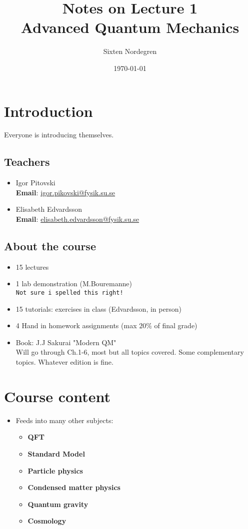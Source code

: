 \documentclass{elsarticle}
\title{Notes on Lecture 1 \\ Advanced Quantum Mechanics}
\author{Sixten Nordegren}
\date{\today}
\begin{document}
\maketitle
	\section*{Introduction}
	Everyone is introducing themselves.
	\subsection*{Teachers}
	\begin{itemize}

		\item Igor Pitovski \\
		\textbf{Email}: \url{igor.pikovski@fysik.su.se} 
		\item Elisabeth Edvardsson \\
		\textbf{Email}: \url{elisabeth.edvardsson@fysik.su.se} 
	\end{itemize}
	\subsection*{About the course}
	\begin{itemize}
		\item 15 lectures
		\item 1 lab demonstration (M.Bouremanne) \\ \texttt{Not sure i spelled 
			this right!}
		\item 15 tutorials: exercises in class (Edvardsson, in person)
		\item 4 Hand in homework assignments (max $20 \%$ of final grade)
		\item Book: J.J Sakurai "Modern QM" \\
			Will go through Ch.1-6, most but all topics covered.
			Some complementary topics. Whatever edition is fine.
	\end{itemize}

	\section*{Course content}
	\begin{itemize}
		\item Feeds into many other subjects:
			\begin{itemize}
				\item \textbf{QFT}
				\item \textbf{Standard Model}
				\item \textbf{Particle physics}
				\item \textbf{Condensed matter physics}
				\item \textbf{Quantum gravity}
				\item \textbf{Cosmology}

			\end{itemize}
	\end{itemize}
\end{document}
